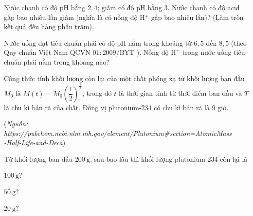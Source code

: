 \begin{vd}%
	Nước chanh có độ pH bằng $2{,}4$; giấm có độ pH bằng $3$. Nước chanh có độ acid gấp bao nhiêu lần giấm (nghĩa là có nồng độ H$^{+}$ gấp bao nhiêu lần)? (Làm tròn kết quả đến hàng phần trăm).
\end{vd}

\begin{vd}%
	Nước uống đạt tiêu chuẩn phải có độ $\mathrm{pH}$ nằm trong khoảng từ $6{,}5$ đến $8{,}5$ (theo Quy chuẩn Việt Nam QCVN $01: 2009 / \mathrm{BYT}$ ). Nồng độ $\mathrm{H}^{+}$ trong nước uống tiêu chuẩn phải nằm trong khoảng nào?
\end{vd}

\begin{vd}%
	Công thức tính khối lượng còn lại của một chất phóng xạ từ khối lượng ban đầu $M_0$ là $M(t)=M_0\left(\dfrac{1}{2}\right)^{\tfrac{1}{T}}$, trong đó $t$ là thời gian tính từ thời điểm ban đầu và $T$ là chu kì bán rã của chất. Đồng vị plutonium-$234$ có chu kì bán rã là $9$ giờ.
	\begin{flushright}
		(\textit{Nguồn: https://pubchem.ncbi.nlm.nih.gov/element/Plutonium\#section=AtomicMass\\-Half-Life-and-Deca})
	\end{flushright}
	Từ khối lượng ban đầu $200 \mathrm{~g}$, sau bao lâu thì khối lượng plutonium-$234$ còn lại là
	\begin{listEX}[3]
		\item $100 \mathrm{~g}$?
		\item $50 \mathrm{~g}$?
		\item $20 \mathrm{~g}$?
	\end{listEX}
\end{vd}

